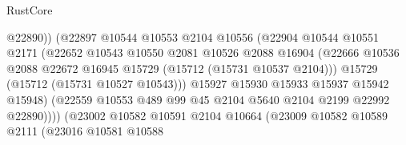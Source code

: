\begin{lexlean}{RustCore}
\begin{coremodule}
                                        @22890))
                                    (@22897
                                      @10544
                                      @10553
                                      @2104
                                      @10556
                                      (@22904
                                        @10544
                                        @10551
                                        @2171
                                        (@22652
                                          @10543
                                          @10550
                                          @2081
                                          @10526
                                          @2088
                                          @16904
                                          (@22666
                                            @10536
                                            @2088
                                            @22672
                                            @16945
                                            @15729
                                            (@15712 (@15731 @10537 @2104)))
                                          @15729
                                          (@15712 (@15731 @10527 @10543)))
                                        @15927
                                        @15930
                                        @15933
                                        @15937
                                        @15942
                                        @15948)
                                      (@22559
                                        @10553
                                        @489
                                        @99
                                        @45
                                        @2104
                                        @5640
                                        @2104
                                        @2199
                                        @22992
                                        @22890))))
                                (@23002
                                  @10582
                                  @10591
                                  @2104
                                  @10664
                                  (@23009
                                    @10582
                                    @10589
                                    @2111
                                    (@23016
                                      @10581
                                      @10588

\end{coremodule}
\end{lexlean}
